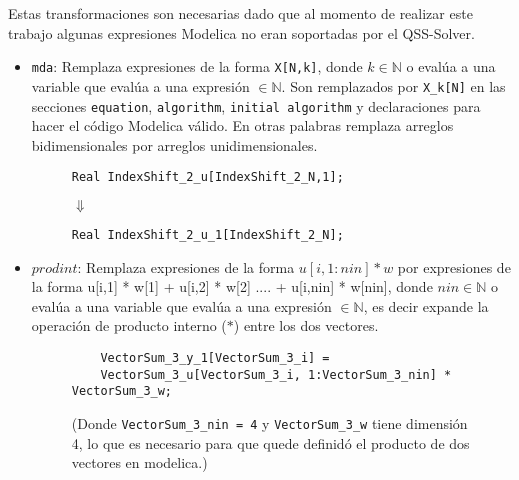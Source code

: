 	Estas transformaciones son necesarias dado que al momento de realizar este trabajo algunas expresiones Modelica no eran soportadas por el QSS-Solver.
	 
	  \begin{itemize}
		\item  \texttt{mda}: Remplaza expresiones de la forma \texttt{X[N,k]}, donde $k \in \mathbb{N}$ o evalúa a una variable que evalúa a una expresión 
			$\in \mathbb{N}$. Son remplazados por \texttt{X\_k[N]} en las secciones \texttt{equation}, \texttt{algorithm}, \texttt{initial algorithm} y 
		declaraciones para hacer el código Modelica válido. En otras palabras remplaza arreglos bidimensionales por arreglos unidimensionales.


\begin{figure}[htp]
\centering
\begin{tcolorbox}
\begin{verbatim}
Real IndexShift_2_u[IndexShift_2_N,1];
\end{verbatim}
\end{tcolorbox}
$\Downarrow$

\begin{tcolorbox}
\begin{verbatim}
Real IndexShift_2_u_1[IndexShift_2_N];
\end{verbatim}
\end{tcolorbox}
\end{figure}

		\item $prodint$: Remplaza expresiones de la forma $u[i, 1:nin] * w$ por expresiones de la forma 
			u[i,1] * w[1] + u[i,2] * w[2] .... + u[i,nin] * w[nin], donde $nin \in \mathbb{N}$ o evalúa a una variable que evalúa a una 
			expresión $\in \mathbb{N}$, es decir expande la operación de producto interno ($*$) entre los dos vectores.

\begin{figure}[htp]
\centering
\begin{tcolorbox}
\begin{verbatim}
    VectorSum_3_y_1[VectorSum_3_i] = 
	VectorSum_3_u[VectorSum_3_i, 1:VectorSum_3_nin] * VectorSum_3_w;
\end{verbatim}
\end{tcolorbox}

	(Donde \texttt{VectorSum\_3\_nin = 4}  y \texttt{VectorSum\_3\_w} tiene dimensión 4, lo que es necesario para que quede definidó el producto de dos 
	vectores en modelica.)


\end{figure}
\end{itemize}
